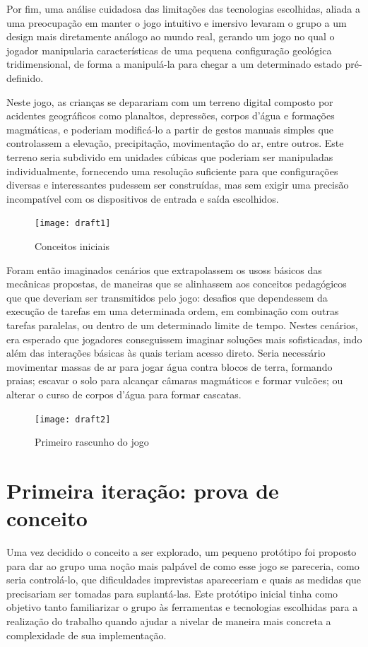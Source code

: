 Por fim, uma análise cuidadosa das limitações das tecnologias escolhidas, aliada a uma preocupação em manter o jogo intuitivo e imersivo levaram o grupo a um design mais diretamente análogo ao mundo real, gerando um jogo no qual o jogador manipularia características de uma pequena configuração geológica tridimensional, de forma a manipulá-la para chegar a um determinado estado pré-definido.

Neste jogo, as crianças se deparariam com um terreno digital composto por acidentes geográficos como planaltos, depressões, corpos d'água e formações magmáticas, e poderiam modificá-lo a partir de gestos manuais simples que controlassem a elevação, precipitação, movimentação do ar, entre outros. Este terreno seria subdivido em unidades cúbicas que poderiam ser manipuladas individualmente, fornecendo uma resolução suficiente para que configurações diversas e interessantes pudessem ser construídas, mas sem exigir uma precisão incompatível com os dispositivos de entrada e saída escolhidos.

\begin{figure}[h]
	\centering
	\texttt{[image: draft1]}
	\caption{Conceitos iniciais}
\end{figure}


Foram então imaginados cenários que extrapolassem os usoss básicos das mecânicas propostas, de maneiras que se alinhassem aos conceitos pedagógicos que que deveriam ser transmitidos pelo jogo: desafios que dependessem da execução de tarefas em uma determinada ordem, em combinação com outras tarefas paralelas, ou dentro de um determinado limite de tempo. Nestes cenários, era esperado que jogadores conseguissem imaginar soluções mais sofisticadas, indo além das interações básicas às quais teriam acesso direto. Seria necessário movimentar massas de ar para jogar água contra blocos de terra, formando praias; escavar o solo para alcançar câmaras magmáticos e formar vulcões; ou alterar o curso de corpos d'água para formar cascatas.

\begin{figure}[h]
	\centering
	\texttt{[image: draft2]}
	\caption{Primeiro rascunho do jogo}
\end{figure}

\section{Primeira iteração: prova de conceito}\label{sec-primeira-iteracao-prova-conceito}

Uma vez decidido o conceito a ser explorado, um pequeno protótipo foi proposto para dar ao grupo uma noção mais palpável de como esse jogo se pareceria, como seria controlá-lo, que dificuldades imprevistas apareceriam e quais as medidas que precisariam ser tomadas para suplantá-las. Este protótipo inicial tinha como objetivo tanto familiarizar o grupo às ferramentas e tecnologias escolhidas para a realização do trabalho quando ajudar a nivelar de maneira mais concreta a complexidade de sua implementação.

